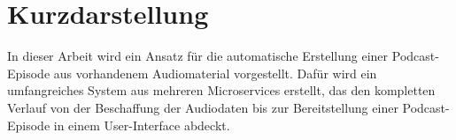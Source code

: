 \thispagestyle{empty}
\section*{Kurzdarstellung}\label{sec:kurzdarstellung}

In dieser Arbeit wird ein Ansatz für die automatische Erstellung einer Podcast-Episode aus vorhandenem Audiomaterial vorgestellt. 
Dafür wird ein umfangreiches System aus mehreren Microservices erstellt, das den kompletten Verlauf von der Beschaffung der Audiodaten bis zur Bereitstellung einer Podcast-Episode in einem User-Interface abdeckt.






